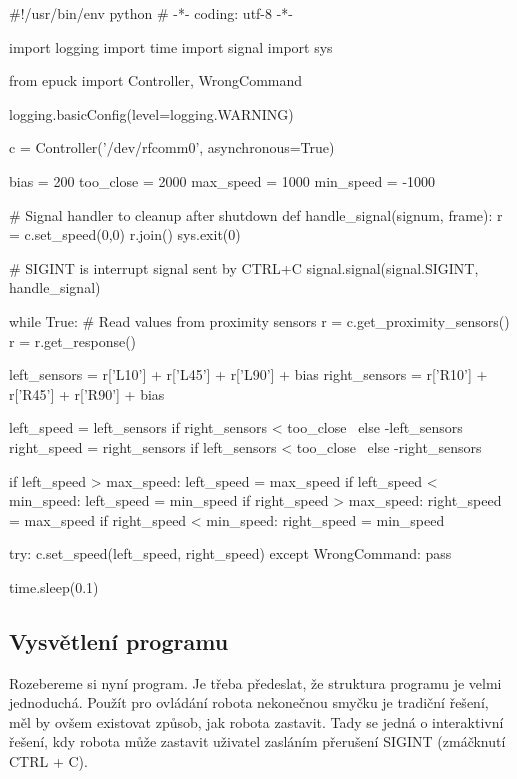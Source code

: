 \documentclass[12pt,notitlepage]{report}
\newenvironment{mylisting}{}{}
\begin{document}
\begin{mylisting}
\begin{pyc}
#!/usr/bin/env python
# -*- coding: utf-8 -*-

import logging
import time
import signal
import sys

from epuck import Controller, WrongCommand

logging.basicConfig(level=logging.WARNING)

c = Controller('/dev/rfcomm0', asynchronous=True)

bias = 200
too_close = 2000
max_speed = 1000
min_speed = -1000

# Signal handler to cleanup after shutdown
def handle_signal(signum, frame):
    r = c.set_speed(0,0)
    r.join()
    sys.exit(0)

# SIGINT is interrupt signal sent by CTRL+C
signal.signal(signal.SIGINT, handle_signal)

while True:
    # Read values from proximity sensors
    r = c.get_proximity_sensors()
    r = r.get_response()

    left_sensors = r['L10'] + r['L45'] + r['L90'] + bias
    right_sensors = r['R10'] + r['R45'] + r['R90'] + bias

    left_speed = left_sensors if right_sensors < too_close \
                 else -left_sensors
    right_speed = right_sensors if left_sensors < too_close \
                  else -right_sensors

    if left_speed > max_speed: left_speed = max_speed
    if left_speed < min_speed: left_speed = min_speed
    if right_speed > max_speed: right_speed = max_speed
    if right_speed < min_speed: right_speed = min_speed

    try:
        c.set_speed(left_speed, right_speed)
    except WrongCommand:
        pass

    time.sleep(0.1)

\end{pyc}
\label{braitenberg}
\end{mylisting}

\subsection{Vysvětlení programu}

Rozebereme si nyní program. Je třeba předeslat, že struktura programu je velmi
jednoduchá. Použít pro ovládání robota nekonečnou smyčku je tradiční řešení,
měl by ovšem existovat způsob, jak robota zastavit. Tady se jedná o
interaktivní řešení, kdy robota může zastavit uživatel zasláním přerušení
SIGINT (zmáčknutí CTRL + C).
\end{document}
